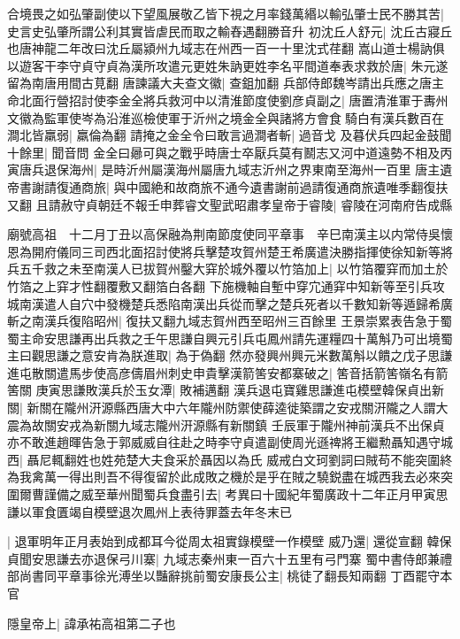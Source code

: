 合境畏之如弘肇副使以下望風展敬乙皆下視之月率錢萬緡以輸弘肇士民不勝其苦|{
	史言史弘肇所謂公利其實皆虐民而取之輸舂遇翻勝音升}
初沈丘人舒元|{
	沈丘古寢丘也唐神龍二年改曰沈丘屬潁州九域志在州西一百一十里沈式荏翻}
嵩山道士楊訥俱以遊客干李守貞守貞為漢所攻遣元更姓朱訥更姓李名平間道奉表求救於唐|{
	朱元遂留為南唐用間古莧翻}
唐諫議大夫查文徽|{
	查鉏加翻}
兵部侍郎魏岑請出兵應之唐主命北面行營招討使李金全將兵救河中以清淮節度使劉彦貞副之|{
	唐置清淮軍于夀州}
文徽為監軍使岑為沿淮巡檢使軍于沂州之境金全與諸將方會食騎白有漢兵數百在澗北皆羸弱|{
	羸倫為翻}
請掩之金全令曰敢言過澗者斬|{
	過音戈}
及暮伏兵四起金鼓聞十餘里|{
	聞音問}
金全曰曏可與之戰乎時唐士卒厭兵莫有鬭志又河中道遠勢不相及丙寅唐兵退保海州|{
	是時沂州屬漢海州屬唐九域志沂州之界東南至海州一百里}
唐主遺帝書謝請復通商旅|{
	與中國絶和故商旅不通今遺書謝前過請復通商旅遺唯季翻復扶又翻}
且請赦守貞朝廷不報壬申葬睿文聖武昭肅孝皇帝于睿陵|{
	睿陵在河南府告成縣}


廟號高祖　十二月丁丑以高保融為荆南節度使同平章事　辛巳南漢主以内常侍吳懷恩為開府儀同三司西北面招討使將兵擊楚攻賀州楚王希廣遣決勝指揮使徐知新等將兵五千救之未至南漢人已拔賀州鑿大穽於城外覆以竹箔加上|{
	以竹箔覆穽而加土於竹箔之上穽才性翻覆敷又翻箔白各翻}
下施機軸自塹中穿宂通穽中知新等至引兵攻城南漢遣人自穴中發機楚兵悉陷南漢出兵從而擊之楚兵死者以千數知新等遁歸希廣斬之南漢兵復陷昭州|{
	復扶又翻九域志賀州西至昭州三百餘里}
王景崇累表告急于蜀蜀主命安思謙再出兵救之壬午思謙自興元引兵屯鳳州請先運糧四十萬斛乃可出境蜀主曰觀思謙之意安肯為朕進取|{
	為于偽翻}
然亦發興州興元米數萬斛以饋之戊子思謙進屯散關遣馬步使高彦儔眉州刺史申貴擊漢箭筈安都寨破之|{
	筈音括箭筈嶺名有箭筈關}
庚寅思謙敗漢兵於玉女潭|{
	敗補邁翻}
漢兵退屯寶雞思謙進屯模壁韓保貞出新關|{
	新關在隴州汧源縣西唐大中六年隴州防禦使薛逵徙築謂之安戎關汧隴之人謂大震為故關安戎為新關九域志隴州汧源縣有新關鎮}
壬辰軍于隴州神前漢兵不出保貞亦不敢進趙暉告急于郭威威自往赴之時李守貞遣副使周光遜禆將王繼勲聶知遇守城西|{
	聶尼輒翻姓也姓苑楚大夫食采於聶因以為氏}
威戒白文珂劉詞曰賊苟不能突圍終為我禽萬一得出則吾不得復留於此成敗之機於是乎在賊之驍鋭盡在城西我去必來突圍爾曹謹備之威至華州聞蜀兵食盡引去|{
	考異曰十國紀年蜀廣政十二年正月甲寅思謙以軍食匱竭自模壁退次鳳州上表待罪蓋去年冬末已}


|{
	退軍明年正月表始到成都耳今從周太祖實錄模壁一作模壁}
威乃還|{
	還從宣翻}
韓保貞聞安思謙去亦退保弓川寨|{
	九域志秦州東一百六十五里有弓門寨}
蜀中書侍郎兼禮部尚書同平章事徐光溥坐以豔辭挑前蜀安康長公主|{
	桃徒了翻長知兩翻}
丁酉罷守本官

隱皇帝上|{
	諱承祐高祖第二子也}


